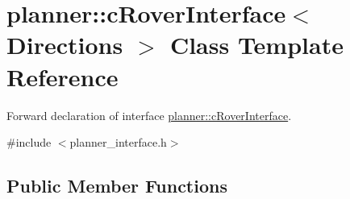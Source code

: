 \hypertarget{classplanner_1_1c_rover_interface}{}\section{planner\+:\+:c\+Rover\+Interface$<$ Directions $>$ Class Template Reference}
\label{classplanner_1_1c_rover_interface}


Forward declaration of interface \mbox{\hyperlink{classplanner_1_1c_rover_interface}{planner\+::c\+Rover\+Interface}}.  




{\ttfamily \#include $<$planner\+\_\+interface.\+h$>$}

\subsection*{Public Member Functions}
